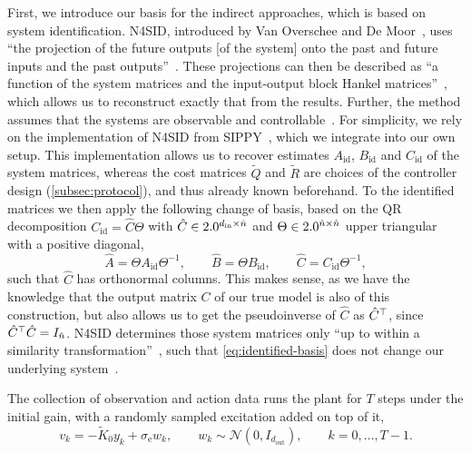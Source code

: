 First, we introduce our basis for the indirect approaches, which is based on system identification. N4SID,
introduced by Van Overschee and De Moor~\cite{VanOverschee1994N4SID}, uses ``the projection of the future outputs [of the system]
onto the past and future inputs and the past outputs''~\cite[Sec.~3]{VanOverschee1994N4SID}. These projections can then be
described as ``a function of the system matrices and the input-output block Hankel matrices''~\cite[Sec.~3]{VanOverschee1994N4SID}, which
allows us to reconstruct exactly that from the results. Further, the method assumes that the systems are
observable and controllable~\cite[Sec.~2.1]{VanOverschee1994N4SID}. For simplicity, we rely on the
implementation of N4SID from SIPPY~\cite{SIPPY2026N4SID}, which we integrate into our own setup. This implementation allows us
to recover estimates $A_{\mathrm{id}}$, $B_{\mathrm{id}}$ and $C_{\mathrm{id}}$ of the system matrices, whereas the cost
matrices $\tilde{Q}$ and $\tilde{R}$ are choices of the controller design (\cref{subsec:protocol}), and thus already known beforehand. To the identified matrices
we then apply the following change of basis, based on the QR decomposition $C_{\mathrm{id}} = \hat{C} \Theta$ with
$\hat{C} \in 2.0^{d_{\mathrm{in}} \times \hat{n}}$ and $\Theta \in 2.0^{\hat{n} \times \hat{n}}$ upper triangular with a positive diagonal,
\begin{equation}
    \label{eq:identified-basis}
    \hat{A} = \Theta A_{\mathrm{id}} \Theta^{-1} , \qquad
    \hat{B} = \Theta B_{\mathrm{id}} , \qquad
    \hat{C} = C_{\mathrm{id}} \Theta^{-1} ,
\end{equation}
such that $\hat{C}$ has orthonormal columns. This makes sense, as we have the knowledge that
the output matrix $C$ of our true model is also of this construction, but also allows us to
get the pseudoinverse of $\hat{C}$ as $\hat{C}^{\top}$, since $\hat{C}^{\top} \hat{C} = I_{\hat{n}}$.
N4SID determines those system matrices only ``up to within a similarity transformation''~\cite[Sec.~2.1]{VanOverschee1994N4SID},
such that \eqref{eq:identified-basis} does not change our underlying system~\cite[pp.~10--11]{Werner2021Control}.

The collection of observation and action data runs the plant for $T$ steps under the initial gain, with a randomly
sampled excitation added on top of it,
\begin{equation}
    \label{eq:identification-input}
    v_k = -\tilde{K}_0 y_k + \sigma_{\mathrm{e}} w_k , \qquad w_k \sim \mathcal{N}(0, I_{d_{\mathrm{out}}}) ,
    \qquad k = 0, \dots, T - 1 .
\end{equation}

